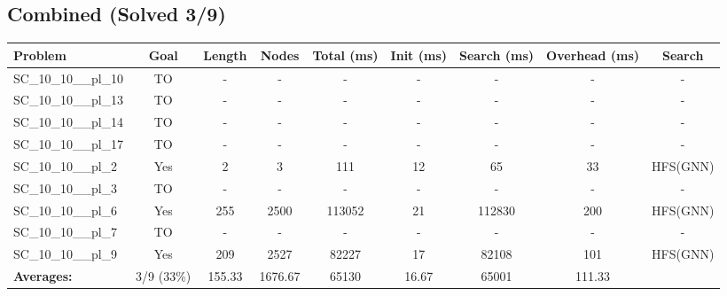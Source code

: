 \documentclass{article}
\begin{document}
\subsection*{Combined (Solved 3/9)}
\begin{tabular}{lcccccccc}
\toprule
Problem & Goal & Length & Nodes & Total (ms) & Init (ms) & Search (ms) & Overhead (ms) & Search \\
\midrule
SC\_10\_10\_\_pl\_10 & TO & - & - & - & - & - & - & - \\
SC\_10\_10\_\_pl\_13 & TO & - & - & - & - & - & - & - \\
SC\_10\_10\_\_pl\_14 & TO & - & - & - & - & - & - & - \\
SC\_10\_10\_\_pl\_17 & TO & - & - & - & - & - & - & - \\
SC\_10\_10\_\_pl\_2 & Yes & 2 & 3 & 111 & 12 & 65 & 33 & HFS(GNN) \\
SC\_10\_10\_\_pl\_3 & TO & - & - & - & - & - & - & - \\
SC\_10\_10\_\_pl\_6 & Yes & 255 & 2500 & 113052 & 21 & 112830 & 200 & HFS(GNN) \\
SC\_10\_10\_\_pl\_7 & TO & - & - & - & - & - & - & - \\
SC\_10\_10\_\_pl\_9 & Yes & 209 & 2527 & 82227 & 17 & 82108 & 101 & HFS(GNN) \\
\textbf{Averages:} & 3/9 (33\%) & 155.33 & 1676.67 & 65130 & 16.67 & 65001 & 111.33 & \\
\bottomrule
\end{tabular}
\\[0.7cm]
\end{document}
